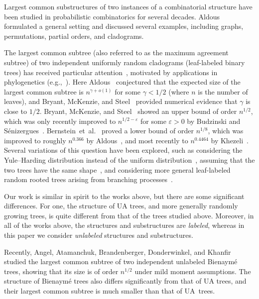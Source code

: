 \documentclass[11pt]{article}
\numberwithin{equation}{section}
\newcommand{\eps}{\varepsilon} %
\theoremstyle{definition}
\begin{document}
Largest common substructures of two instances of a combinatorial structure have been studied in probabilistic combinatorics for several decades. 
Aldous~\cite{AldousOpenProblem_substructures} formulated a general setting and discussed several examples, including graphs, permutations, partial orders, and cladograms.  %

The largest common subtree (also referred to as the maximum agreement subtree) of two independent uniformly random cladograms (leaf-labeled binary trees) has received particular attention~\cite{AldousOpenProblem_substructures,bryant2003size,bernstein2015bounds,misra2019bounds,bordewich2022maximum,aldous2022largest,pittel2023expected,khezeli2024improved,budzinski2024maximum}, motivated by applications in phylogenetics (e.g.,~\cite{de2007congruence}). 
Here Aldous~\cite{AldousOpenProblem_substructures} conjectured that the expected size of the largest common subtree is $n^{\gamma + o(1)}$ for some $\gamma < 1/2$ (where $n$ is the number of leaves), 
and Bryant, McKenzie, and Steel~\cite{bryant2003size} provided numerical evidence that $\gamma$ is close to $1/2$. 
Bryant, McKenzie, and Steel~\cite{bryant2003size} showed an upper bound of order $n^{1/2}$, which was only recently improved to $n^{1/2-\eps}$ for some $\eps > 0$ by Budzinski and S\'enizergues~\cite{budzinski2024maximum}. 
Bernstein~et~al.~\cite{bernstein2015bounds} proved a lower bound of order $n^{1/8}$, which was improved to roughly $n^{0.366}$ by Aldous~\cite{aldous2022largest}, and most recently to $n^{0.4464}$ by Khezeli~\cite{khezeli2024improved}. 
Several variations of this question have been explored, such as considering the Yule--Harding distribution instead of the uniform distribution~\cite{bryant2003size,bernstein2015bounds}, assuming that the two trees have the same shape~\cite{misra2019bounds}, and considering more general leaf-labeled random rooted trees arising from branching processes~\cite{pittel2023expected}.

Our work is similar in spirit to the works above, but there are some significant differences. 
For one, the structure of UA trees, and more generally randomly growing trees, is quite different from that of the trees studied above. 
Moreover, in all of the works above, the structures and substructures are \emph{labeled}, 
whereas in this paper we consider \emph{unlabeled} structures and substructures. 

Recently, Angel, Atamanchuk, Brandenberger, Donderwinkel, and Khanfir~\cite{angel2025largest} studied the largest common subtree of two independent unlabeled Bienaym\'e trees, showing that its size is of order $n^{1/2}$ under mild moment assumptions. 
The structure of Bienaym\'e trees also differs significantly from that of UA trees, and their largest common subtree is much smaller than that of UA~trees. 
\end{document}
